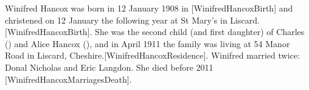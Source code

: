 
Winifred Hancox was born in 12 January 1908 in \cite{BMD1907}[WinifredHancoxBirth] and christened on 12 January the following year at St Mary's in Liscard.\cite{ParishReg}[WinifredHancoxBirth]. She was the second child (and first daughter) of Charles () and Alice Hancox (), and in April 1911 the family was living at 54 Manor Road in Liscard, Cheshire.\cite{1911Census}[WinifredHancoxResidence].
Winifred married twice: Donal Nicholas and Eric Langdon. She died before 2011 [WinifredHancoxMarriagesDeath].
